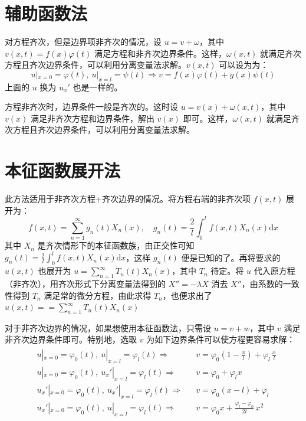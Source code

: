 \documentclass[UTF8]{report}
\theoremstyle{MyLineTheoremStyle} %
\theoremstyle{MyBlockTheoremStyle} %
\theoremstyle{MySubsubsectionStyle} %
\begin{document}
\section{辅助函数法}

对方程齐次，但是边界项非齐次的情况，设 $u = v + \omega$，其中 $v(x, t) = f(x)\varphi(t)$ 满足方程和非齐次边界条件。这样，$\omega(x, t)$ 就满足齐次方程且齐次边界条件，可以利用分离变量法求解。$v(x, t)$ 可以设为为：
\begin{equation}
    u|_{x = 0} = \varphi(t),\ u|_{x = l} = \psi(t) \Longrightarrow v = f(x) \varphi(t) + g(x)\psi(t)
\end{equation}
上面的 $u$ 换为 $u_x'$ 也是一样的。

方程非齐次时，边界条件一般是齐次的。这时设 $u = v(x) + \omega(x, t)$，其中 $v(x)$ 满足非齐次方程和边界条件，解出 $v(x)$ 即可。这样，$\omega(x, t)$ 就满足齐次方程且齐次边界条件，可以利用分离变量法求解。

\section{本征函数展开法}
此方法适用于非齐次方程+齐次边界的情况。将方程右端的非齐次项 $f(x,t)$ 展开为：
\begin{equation}
    f(x,t) = \sum_{n=1}^{\infty} g_n(t) X_n(x),\quad g_n(t) = \frac{2}{l}\int_{0}^{l} f(x,t)X_n(x) \mathrm{d}x
\end{equation}
其中 $X_n$ 是齐次情形下的本征函数族，由正交性可知 $g_n(t) = \frac{2}{l}\int_{0}^{l} f(x,t)X_n(x) \mathrm{d}x$，这样 $g_n(t)$ 便是已知的了。再将要求的 $u(x,t)$ 也展开为 $u = \sum_{n=1}^{\infty} T_n(t)X_n(x)$，其中 $T_n$ 待定。将 $u$ 代入原方程（非齐次），用齐次形式下分离变量法得到的 $X'' = - \lambda X$ 消去 $X''$，由系数的一致性得到 $T_n$ 满足常的微分方程，由此求得 $T_n$，也便求出了 $u(x,t) =  = \sum_{n=1}^{\infty} T_n(t)X_n(x)$

对于非齐次边界的情况，如果想使用本征函数法，只需设 $u = v + w$，其中 $v$ 满足非齐次边界条件即可。特别地，选取 $v$ 为如下边界条件可以使方程更容易求解：
\begin{gather}
\begin{aligned}
    &u|_{x = 0} = \varphi_0(t),\ u|_{x = l} = \varphi_l(t) \Longrightarrow&& v = \varphi_0 \left(1 - \frac{x}{l}\right) + \varphi_l \,\frac{x}{l} \\ 
    &u|_{x = 0} = \varphi_0(t),\ u_x'|_{x = l} = \varphi_l(t) \Longrightarrow&& v = \varphi_0 + \varphi_l x \\ 
    &u_x'|_{x = 0} = \varphi_0(t),\ u_x'|_{x = l} = \varphi_l(t) \Longrightarrow&& v = \varphi_0 (x - l) + \varphi_l \\ 
    &u_x'|_{x = 0} = \varphi_0(t),\ u|_{x = l} = \varphi_l(t) \Longrightarrow&& v =  \varphi_0 x + \frac{\varphi_l - \varphi_0}{2l}\,x^2
\end{aligned}
\end{gather}
\end{document}
